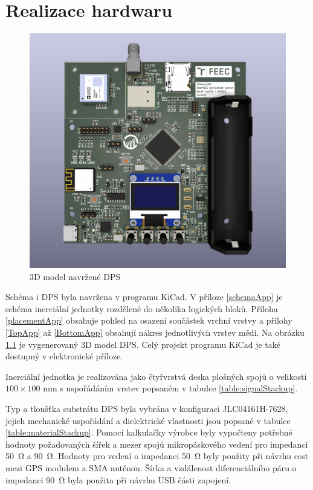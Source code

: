 \chapter{Realizace hardwaru} \label{hardware}
\begin{figure}[h]
    \centering
    \includegraphics[width=\textwidth]{KiCad/3Dboard}
    \caption{3D model navržené DPS}
    \label{fig:3Dboard}
\end{figure}

Schéma i \ac{DPS} byla navržena v programu KiCad. V příloze \ref{schemaApp} je schéma inerciální jednotky rozdělené do několika logických bloků. Příloha \ref{placementApp} obsahuje pohled na osazení součástek vrchní vrstvy a přílohy \ref{TopApp} až \ref{BottomApp} obsahují nákres jednotlivých vrstev mědi. Na obrázku \ref{fig:3Dboard} je vygenerovaný 3D model \ac{DPS}. Celý projekt programu KiCad je také dostupný v elektronické příloze.

Inerciální jednotka je realizována jako čtyřvrstvá deska plošných spojů o velikosti $ 100 \times 100 $ mm s uspořádáním vrstev popsaném v tabulce \ref{table:signalStackup}.


Typ a tloušťka substrátu \ac{DPS} byla vybrána v konfiguraci JLC04161H-7628, jejich mechanické uspořádání a dielektrické vlastnosti jsou popsané v tabulce \ref{table:materialStackup}. Pomocí kalkulačky výrobce byly vypočteny potřebné hodnoty požadovaných šířek a mezer spojů mikropáskového vedení pro impedanci \SI{50}{\ohm} a \SI{90}{\ohm}. Hodnoty pro vedení o impedanci \SI{50}{\ohm} byly použity při návrhu cest mezi \ac{GPS} modulem a \ac{SMA} anténou. Šírka a vzdálenost diferenciálního páru o impedanci \SI{90}{\ohm} byla použita při návrhu \ac{USB} části zapojení.


